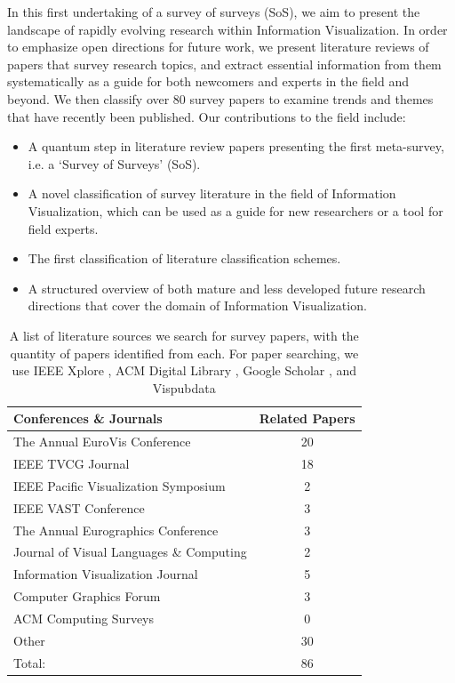 In this first undertaking of a survey of surveys (SoS), we aim to present the landscape of rapidly evolving research within Information Visualization. In order to emphasize open directions for future work, we present literature reviews of papers that survey research topics, and extract essential information from them systematically as a guide for both newcomers and experts in the field and beyond. We then classify over 80 survey papers to examine trends and themes that have recently been published. Our contributions to the field include:
\begin{itemize}
\item  A quantum step in literature review papers presenting the first meta-survey, i.e. a `Survey of Surveys' (SoS).
\item A novel classification of survey literature in the field of Information Visualization, which can be used as a guide for new researchers or a tool for field experts.
\item The first classification of literature classification schemes.
\item A structured overview of both mature and less developed future research directions that cover the domain of Information Visualization.
\end{itemize}

\begin{table}[t]
\footnotesize
\centering
{}
\begin{tabularx}{0.7\textwidth}{|X|c|}
\hline \rowcolor{black!15}
\textbf{Conferences \& Journals} & \textbf{Related Papers} \\ \hline
The Annual EuroVis Conference & 20  \\
IEEE TVCG Journal & 18 \\
IEEE Pacific Visualization Symposium & 2 \\
IEEE VAST Conference & 3 \\
The Annual Eurographics Conference & 3 \\
Journal of Visual Languages \& Computing & 2 \\
Information Visualization Journal & 5 \\
Computer Graphics Forum & 3 \\
ACM Computing Surveys & 0 \\
Other & 30 \\ 
\hline
\rowcolor{black!15} \centering 
Total: & 86 \\
\hline
\end{tabularx}
\caption{A list of literature sources we search for survey papers, with the quantity of papers identified from each. For paper searching, we use IEEE Xplore  \cite{ieeexplore}, ACM Digital Library \cite{acmdigitallibrary}, Google Scholar \cite{scholar}, and Vispubdata \cite{isenberg2017VPD}} \label{table:searchTable}
\end{table}

